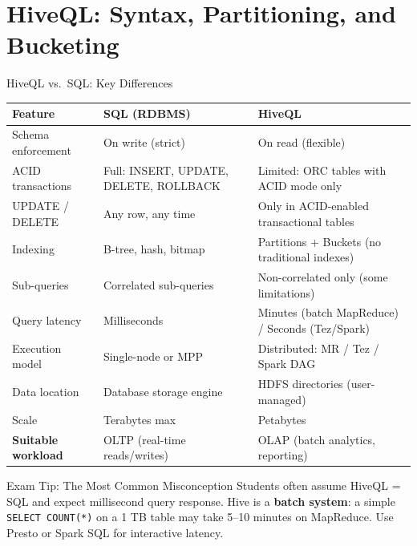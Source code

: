 \documentclass[aspectratio=169,10pt]{beamer}
\begin{document}
\section{HiveQL: Syntax, Partitioning, and Bucketing}

\begin{frame}{HiveQL vs.\ SQL: Key Differences}
  \begin{center}
  \renewcommand{\arraystretch}{1.55}
  \begin{tabular}{p{3.0cm}p{4.2cm}p{4.2cm}}
    \toprule
    \textbf{Feature}    & \textbf{SQL (RDBMS)} & \textbf{HiveQL} \\
    \midrule
    Schema enforcement  & On write (strict)      & On read (flexible) \\
    ACID transactions   & Full: INSERT, UPDATE, DELETE, ROLLBACK & Limited: ORC tables with ACID mode only \\
    UPDATE / DELETE     & Any row, any time      & Only in ACID-enabled transactional tables \\
    Indexing            & B-tree, hash, bitmap   & Partitions + Buckets (no traditional indexes) \\
    Sub-queries         & Correlated sub-queries  & Non-correlated only (some limitations) \\
    Query latency       & Milliseconds           & Minutes (batch MapReduce) / Seconds (Tez/Spark) \\
    Execution model     & Single-node or MPP     & Distributed: MR / Tez / Spark DAG \\
    Data location       & Database storage engine & HDFS directories (user-managed) \\
    Scale               & Terabytes max          & Petabytes \\
    \midrule
    \textbf{Suitable workload} & OLTP (real-time reads/writes) & OLAP (batch analytics, reporting) \\
    \bottomrule
  \end{tabular}
  \end{center}
  \vspace{4pt}
  \begin{alertblock}{Exam Tip: The Most Common Misconception}
    \small Students often assume HiveQL = SQL and expect millisecond query response.  Hive is a \textbf{batch system}: a simple \texttt{SELECT COUNT(*)} on a 1 TB table may take 5--10 minutes on MapReduce.  Use Presto or Spark SQL for interactive latency.
  \end{alertblock}
\end{frame}
\end{document}
